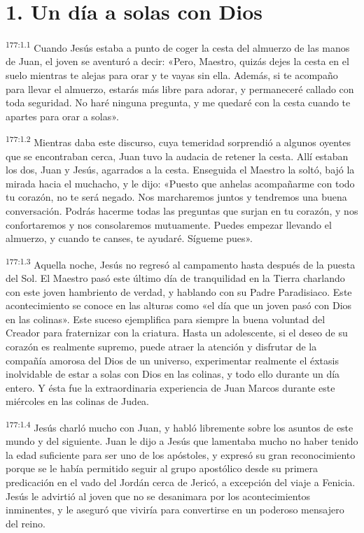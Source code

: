 \section*{1. Un día a solas con Dios}
\par 
\textsuperscript{177:1.1} Cuando Jesús estaba a punto de coger la cesta del almuerzo de las manos de Juan, el joven se aventuró a decir: «Pero, Maestro, quizás dejes la cesta en el suelo mientras te alejas para orar y te vayas sin ella. Además, si te acompaño para llevar el almuerzo, estarás más libre para adorar, y permaneceré callado con toda seguridad. No haré ninguna pregunta, y me quedaré con la cesta cuando te apartes para orar a solas».

\par 
\textsuperscript{177:1.2} Mientras daba este discurso, cuya temeridad sorprendió a algunos oyentes que se encontraban cerca, Juan tuvo la audacia de retener la cesta. Allí estaban los dos, Juan y Jesús, agarrados a la cesta. Enseguida el Maestro la soltó, bajó la mirada hacia el muchacho, y le dijo: «Puesto que anhelas acompañarme con todo tu corazón, no te será negado. Nos marcharemos juntos y tendremos una buena conversación. Podrás hacerme todas las preguntas que surjan en tu corazón, y nos confortaremos y nos consolaremos mutuamente. Puedes empezar llevando el almuerzo, y cuando te canses, te ayudaré. Sígueme pues».

\par 
\textsuperscript{177:1.3} Aquella noche, Jesús no regresó al campamento hasta después de la puesta del Sol. El Maestro pasó este último día de tranquilidad en la Tierra charlando con este joven hambriento de verdad, y hablando con su Padre Paradisiaco. Este acontecimiento se conoce en las alturas como «el día que un joven pasó con Dios en las colinas». Este suceso ejemplifica para siempre la buena voluntad del Creador para fraternizar con la criatura. Hasta un adolescente, si el deseo de su corazón es realmente supremo, puede atraer la atención y disfrutar de la compañía amorosa del Dios de un universo, experimentar realmente el éxtasis inolvidable de estar a solas con Dios en las colinas, y todo ello durante un día entero. Y ésta fue la extraordinaria experiencia de Juan Marcos durante este miércoles en las colinas de Judea.

\par 
\textsuperscript{177:1.4} Jesús charló mucho con Juan, y habló libremente sobre los asuntos de este mundo y del siguiente. Juan le dijo a Jesús que lamentaba mucho no haber tenido la edad suficiente para ser uno de los apóstoles, y expresó su gran reconocimiento porque se le había permitido seguir al grupo apostólico desde su primera predicación en el vado del Jordán cerca de Jericó, a excepción del viaje a Fenicia. Jesús le advirtió al joven que no se desanimara por los acontecimientos inminentes, y le aseguró que viviría para convertirse en un poderoso mensajero del reino.

